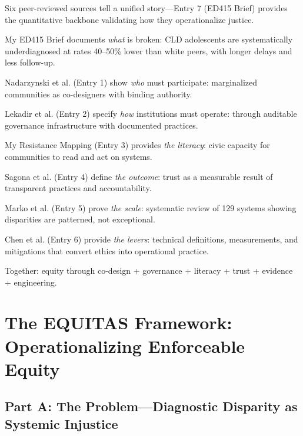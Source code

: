 \documentclass[12pt,a4paper]{article}
\begin{document}
\begin{tcolorbox}[colback=noteback,colframe=noteborder,title=\textbf{The Convergence: From Theory to Auditable Practice}]
Six peer-reviewed sources tell a unified story—Entry 7 (ED415 Brief) provides the quantitative backbone validating how they operationalize justice.

My ED415 Brief documents \textit{what} is broken: CLD adolescents are systematically underdiagnosed at rates 40--50\% lower than white peers, with longer delays and less follow-up.\cite{garcia_ed415}

Nadarzynski et al. (Entry 1) show \textit{who} must participate: marginalized communities as co-designers with binding authority.\cite{nadarzynski2024}

Lekadir et al. (Entry 2) specify \textit{how} institutions must operate: through auditable governance infrastructure with documented practices.\cite{lekadir2025}

My Resistance Mapping (Entry 3) provides \textit{the literacy}: civic capacity for communities to read and act on systems.

Sagona et al. (Entry 4) define \textit{the outcome}: trust as a measurable result of transparent practices and accountability.\cite{sagona2025}

Marko et al. (Entry 5) prove \textit{the scale}: systematic review of 129 systems showing disparities are patterned, not exceptional.\cite{marko2025}

Chen et al. (Entry 6) provide \textit{the levers}: technical definitions, measurements, and mitigations that convert ethics into operational practice.\cite{chen2023}

Together: equity through co-design + governance + literacy + trust + evidence + engineering.
\end{tcolorbox}

\section{The EQUITAS Framework: Operationalizing Enforceable Equity}

\subsection{Part A: The Problem—Diagnostic Disparity as Systemic Injustice}
\end{document}

